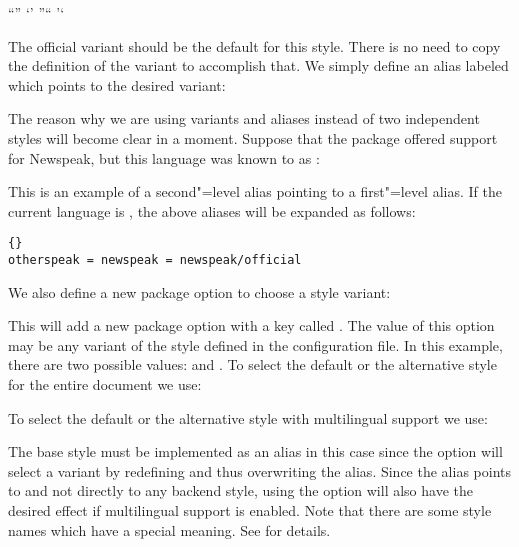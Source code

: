 \documentclass{ltxdockit}[2010/09/26]
\begin{document}
\begin{ltxcode}
  {\textquotedblleft}{\textquotedblright}
  {\textquoteleft}{\textquoteright}
  {\textquotedblright}{\textquotedblleft}
  {\textquoteright}{\textquoteleft}
\end{ltxcode}
%
The official variant should be the default for this style. There is no need to copy the definition of the  variant to accomplish that. We simply define an alias labeled  which points to the desired variant:

\begin{ltxcode}
\end{ltxcode}
%
The reason why we are using variants and aliases instead of two independent styles will become clear in a moment. Suppose that the  package offered support for Newspeak, but this language was known to  as :

\begin{ltxcode}
\end{ltxcode}
%
This is an example of a second"=level alias pointing to a first"=level alias. If the current language is , the above aliases will be expanded as follows:

\begin{lstlisting}[style=plain]{}
otherspeak = newspeak = newspeak/official
\end{lstlisting}
%
We also define a new package option to choose a style variant:

\begin{ltxcode}
\end{ltxcode}
%
This will add a new package option with a key called . The value of this option may be any variant of the  style defined in the configuration file. In this example, there are two possible values:  and . To select the default or the alternative style for the entire document we use:

\begin{ltxcode}
\usepackage[style=newspeak]{csquotes}
\usepackage[style=newspeak,newspeak=unofficial]{csquotes}
\end{ltxcode}
%
To select the default or the alternative style with multilingual support we use:

\begin{ltxcode}
\usepackage[babel]{csquotes}
\usepackage[babel,newspeak=unofficial]{csquotes}
\end{ltxcode}
%
The base style must be implemented as an alias in this case since the  option will select a variant by redefining and thus overwriting the  alias. Since the  alias points to  and not directly to any backend style, using the  option will also have the desired effect if multilingual support is enabled. Note that there are some style names which have a special meaning. See  for details.
\end{document}
